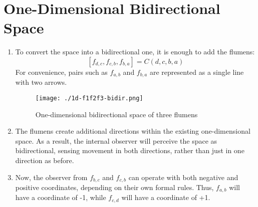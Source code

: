 \documentclass[final]{article}
\begin{document}
    \section{One-Dimensional Bidirectional Space}

        \begin{enumerate}

            \item To convert the space into a bidirectional one, it is enough to
            add the flumens: \[ [f_{d,c}, f_{c,b}, f_{b,a}]=C(d,c,b,a) \] For
            convenience, pairs such as \( f_{a,b} \) and \(f_{b,a}\) are represented as a single line with
            two arrows.

            \begin{figure}[H]
                \centering
                \texttt{[image: ./1d-f1f2f3-bidir.png]}
                \caption{One-dimensional bidirectional space of three flumens}
                \label{fig:image}
            \end{figure}

            \item The flumens create additional directions within the existing
            one-dimensional space. As a result, the internal observer will perceive
            the space as bidirectional, sensing movement in both directions, rather than just
            in one direction as before.

            \item Now, the observer from \(f_{b,c}\) and \(f_{c,b}\) can operate
            with both negative and positive coordinates, depending on
            their own formal rules. Thus, \(f_{a,b}\) will have a coordinate
            of -1, while \(f_{c,d}\) will have a coordinate of +1.

        \end{enumerate}
\end{document}
